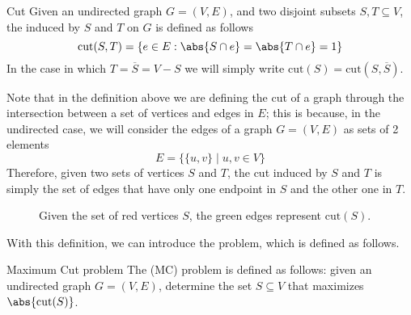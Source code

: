 \documentclass[a4paper, 12pt]{report}
\begin{document}
    \begin{frameddefn}{Cut}
        Given an undirected graph $G = (V, E)$, and two disjoint subsets $S, T \subseteq V$, the  induced by $S$ and $T$ on $G$ is defined as follows $$\mathrm{cut}(S, T) = \{e \in E : \abs{S \cap e} = \abs{T \cap e} = 1\}$$ In the case in which $T = \overline S = V - S$ we will simply write $\mathrm{cut}(S) = \mathrm{cut}(S, \overline S)$.
    \end{frameddefn}

    Note that in the definition above we are defining the cut of a graph through the intersection between a set of vertices and edges in $E$; this is because, in the undirected case, we will consider the edges of a graph $G = (V, E)$ as sets of 2 elements $$E = \{\{u, v\} \mid u, v \in V\}$$ Therefore, given two sets of vertices $S$ and $T$, the cut induced by $S$ and $T$ is simply the set of edges that have only one endpoint in $S$ and the other one in $T$.

    \begin{figure}[H]
        \centering
        \caption{Given the set of red vertices $S$, the green edges represent $\mathrm{cut}(S)$.}
    \end{figure}

    With this definition, we can introduce the  problem, which is defined as follows.

    \begin{frameddefn}{Maximum Cut problem}
        The  (MC) problem is defined as follows: given an undirected graph $G = (V, E)$, determine the set $S \subseteq V$ that maximizes $\abs{\mathrm{cut}(S)}$.
    \end{frameddefn}
\end{document}
